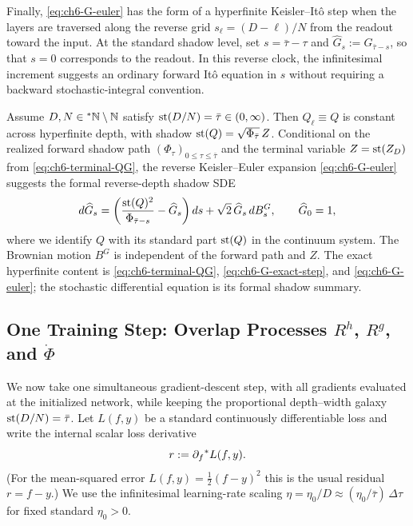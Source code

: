 Finally, \eqref{eq:ch6-G-euler} has the form of a hyperfinite Keisler--It\^o step when the layers are traversed along the reverse grid $s_\ell = (D - \ell)/N$ from the readout toward the input. At the standard shadow level, set $s = \bar{\tau} - \tau$ and $\widehat{G}_s := G_{\bar{\tau}-s}$, so that $s = 0$ corresponds to the readout. In this reverse clock, the infinitesimal increment suggests an ordinary forward It\^o equation in $s$ without requiring a backward stochastic-integral convention.

\begin{proposition}
\label{prop:formal-qg-limit}
Assume $D, N \in {}^*\mathbb{N} \setminus \mathbb{N}$ satisfy $\operatorname{st}(D/N) = \bar{\tau} \in (0, \infty)$. Then $Q_\ell \equiv Q$ is constant across hyperfinite depth, with shadow $\operatorname{st}(Q) = \sqrt{\Phi_{\bar{\tau}}}\,Z$. Conditional on the realized forward shadow path $(\Phi_\tau)_{0 \le \tau \le \bar{\tau}}$ and the terminal variable $Z = \operatorname{st}(Z_D)$ from \eqref{eq:ch6-terminal-QG}, the reverse Keisler--Euler expansion \eqref{eq:ch6-G-euler} suggests the formal reverse-depth shadow SDE
\begin{equation}
\label{eq:ch6-G-sde}
d\widehat{G}_s = \left(\frac{\operatorname{st}(Q)^2}{\Phi_{\bar{\tau}-s}} - \widehat{G}_s\right)ds + \sqrt{2}\,\widehat{G}_s\,dB_s^G, \qquad
\widehat{G}_0 = 1,
\end{equation}
where we identify $Q$ with its standard part $\operatorname{st}(Q)$ in the continuum system. The Brownian motion $B^G$ is independent of the forward path and $Z$. The exact hyperfinite content is \eqref{eq:ch6-terminal-QG}, \eqref{eq:ch6-G-exact-step}, and \eqref{eq:ch6-G-euler}; the stochastic differential equation is its formal shadow summary.
\end{proposition}

\subsection{One Training Step: Overlap Processes \texorpdfstring{$R^h$, $R^g$, and $\dot{\Phi}$}{Rh, Rg, and dot-Phi}}
\label{subsec:one-training-step}

We now take one simultaneous gradient-descent step, with all gradients evaluated at the initialized network, while keeping the proportional depth--width galaxy $\operatorname{st}(D/N) = \bar{\tau}$. Let $L(f, y)$ be a standard continuously differentiable loss and write the internal scalar loss derivative
\begin{equation}
\label{eq:ch6-loss-residual}
r := \partial_f {}^*L(f, y).
\end{equation}
(For the mean-squared error $L(f, y) = \frac{1}{2}(f - y)^2$ this is the usual residual $r = f - y$.) We use the infinitesimal learning-rate scaling $\eta = \eta_0 / D \approx (\eta_0 / \bar{\tau})\,\Delta\tau$ for fixed standard $\eta_0 > 0$.

